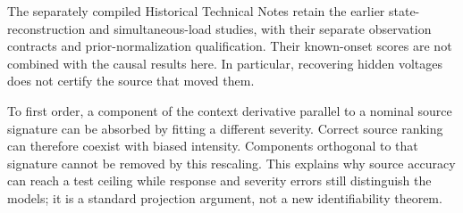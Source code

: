 The separately compiled Historical Technical Notes retain the earlier state-reconstruction and
simultaneous-load studies, with their separate observation contracts and
prior-normalization qualification. Their known-onset scores are not
combined with the causal results here. In particular, recovering hidden
voltages does not certify the source that moved them.

To first order, a component of the context derivative parallel to a nominal
source signature can be absorbed by fitting a different severity. Correct
source ranking can therefore coexist with biased intensity. Components
orthogonal to that signature cannot be removed by this rescaling. This
explains why source accuracy can reach a test ceiling while response and
severity errors still distinguish the models; it is a standard projection
argument, not a new identifiability theorem.
